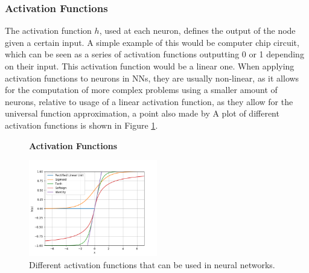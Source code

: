\subsubsection{Activation Functions}

The activation function $h$, used at each neuron, defines the output of the
node given a certain input. A simple example of this would be computer chip
circuit, which can be seen as a series of activation functions outputting 0 or
1 depending on their input. This activation function would be a linear one.
When applying activation functions to neurons in \gls{NN}s, they are usually
non-linear, as it allows for the computation of more complex problems using a
smaller amount of neurons, relative to usage of a linear activation function,
as they allow for the universal function approximation, a point also made by
\cite{6797088} A plot of different activation functions is shown in Figure
\ref{fig:activation_functions}.

\begin{figure}
    \centering
    \textbf{Activation Functions}\par\medskip
    \includegraphics[width=0.5\textwidth]{./pictures/method/activation_functions.png}
    \caption{Different activation functions that can be used in neural
        networks.}
    \label{fig:activation_functions}
\end{figure}

